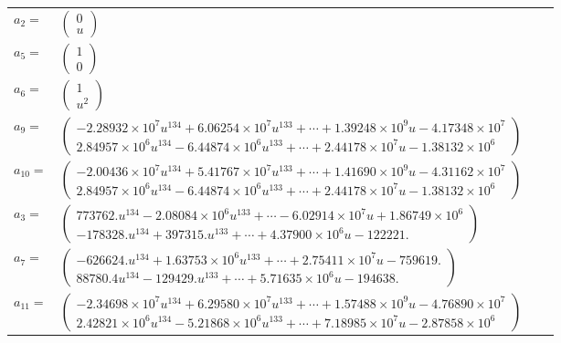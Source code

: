 \documentclass[1p]{elsarticle_modified}
\theoremstyle{definition}
\begin{document}
\begin{tabular}{m{7pt} m{180pt} m{7pt} m{180pt} }
\flushright $a_{2}=$&$\begin{pmatrix}0\\u\end{pmatrix}$ \\
\flushright $a_{5}=$&$\begin{pmatrix}1\\0\end{pmatrix}$ \\
\flushright $a_{6}=$&$\begin{pmatrix}1\\u^2\end{pmatrix}$ \\
\flushright $a_{9}=$&$\begin{pmatrix}-2.28932\times10^{7} u^{134}+6.06254\times10^{7} u^{133}+\cdots+1.39248\times10^{9} u-4.17348\times10^{7}\\2.84957\times10^{6} u^{134}-6.44874\times10^{6} u^{133}+\cdots+2.44178\times10^{7} u-1.38132\times10^{6}\end{pmatrix}$ \\
\flushright $a_{10}=$&$\begin{pmatrix}-2.00436\times10^{7} u^{134}+5.41767\times10^{7} u^{133}+\cdots+1.41690\times10^{9} u-4.31162\times10^{7}\\2.84957\times10^{6} u^{134}-6.44874\times10^{6} u^{133}+\cdots+2.44178\times10^{7} u-1.38132\times10^{6}\end{pmatrix}$ \\
\flushright $a_{3}=$&$\begin{pmatrix}773762. u^{134}-2.08084\times10^{6} u^{133}+\cdots-6.02914\times10^{7} u+1.86749\times10^{6}\\-178328. u^{134}+397315. u^{133}+\cdots+4.37900\times10^{6} u-122221.\end{pmatrix}$ \\
\flushright $a_{7}=$&$\begin{pmatrix}-626624. u^{134}+1.63753\times10^{6} u^{133}+\cdots+2.75411\times10^{7} u-759619.\\88780.4 u^{134}-129429. u^{133}+\cdots+5.71635\times10^{6} u-194638.\end{pmatrix}$ \\
\flushright $a_{11}=$&$\begin{pmatrix}-2.34698\times10^{7} u^{134}+6.29580\times10^{7} u^{133}+\cdots+1.57488\times10^{9} u-4.76890\times10^{7}\\2.42821\times10^{6} u^{134}-5.21868\times10^{6} u^{133}+\cdots+7.18985\times10^{7} u-2.87858\times10^{6}\end{pmatrix}$ \\

\end{tabular}
\end{document}
